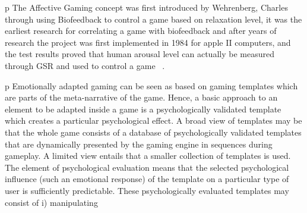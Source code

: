 p The Affective Gaming concept was first introduced by Wehrenberg, Charles through using Biofeedback to control a game based on relaxation level, it was the earliest research for correlating a game with biofeedback and after years of research the project was first implemented in 1984 for apple II computers, and the test results proved that human arousal level can actually be measured through GSR and used to control a game  ~\cite{wehrenberg1995willball}.

p Emotionally adapted gaming can be seen as based on gaming templates which are parts of the meta-narrative of the game. Hence, a basic approach to an element to be adapted inside a game is a psychologically validated template which creates a particular psychological effect. A broad view of templates may be that the whole game consists of a database of psychologically validated templates that are dynamically presented by the gaming engine in sequences during gameplay. A limited view entails that a smaller collection of templates is used. The element of psychological evaluation means that the selected psychological influence (such an emotional response) of the template on a particular type of user is sufficiently predictable. These psychologically evaluated templates may consist of i) manipulating 

